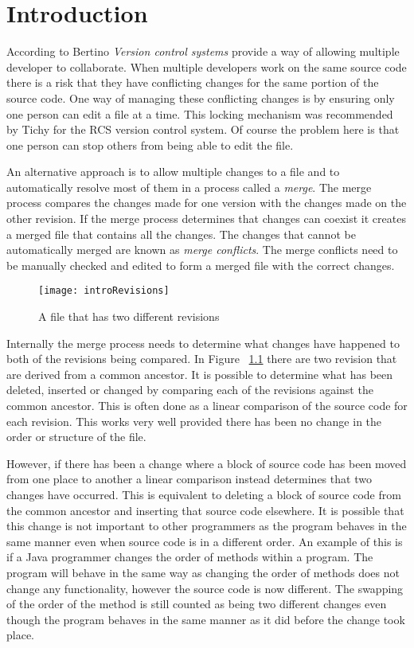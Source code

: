 
\chapter{Introduction}\label{C:intro}

According to Bertino \cite{Bertino2012} \emph{Version control systems} provide a way of allowing multiple developer to collaborate. When multiple developers work on the same source code there is a risk that they have conflicting changes for the same portion of the source code.  One way of managing these conflicting changes is by ensuring only one person can edit a file at a time. This locking mechanism was recommended by Tichy \cite{Tichy1982} for the RCS version control system. Of course the problem here is that one person can stop others from being able to edit the file. 

An alternative approach is to allow multiple changes to a file and to automatically resolve most of them in a process called a \emph{merge}.  The merge process compares the changes made for one version with the changes made on the other revision. If the merge process determines that changes can coexist it creates a merged file that contains all the changes. The changes that cannot be automatically merged are known as \emph{merge conflicts}.  The merge conflicts need to be manually checked and edited to form a merged file with the correct changes.

\begin{figure}[!t]
 \begin{center}
 \texttt{[image: introRevisions]}
 \end{center}
 \caption{A file that has two different revisions}
 \label{fig:introRevisions}
\end{figure}


Internally the merge process needs to determine what changes have happened to both of the revisions being compared. In Figure  ~\ref{fig:introRevisions} there are two revision that are derived from a common ancestor. It is possible to determine what has been deleted, inserted or changed by comparing each of the revisions against the common ancestor.  This is often done as a linear comparison of the source code for each revision. This works very well provided there has been no change in the order or structure of the file.

However, if there has been a change where a block of source code has been moved from one place to another a linear comparison instead determines that two changes have occurred.  This is equivalent to deleting a block of source code from the common ancestor and inserting that source code elsewhere. It is possible that this change is not important to other programmers as the program behaves in the same manner even when source code is in a different order.  An example of this is if a Java programmer changes the order of methods within a program.  The program will behave in the same way as changing the order of methods does not change any functionality, however the source code is now different. The swapping of the order of the method is still counted as being two different changes even though the program behaves in the same manner as it did before the change took place.

